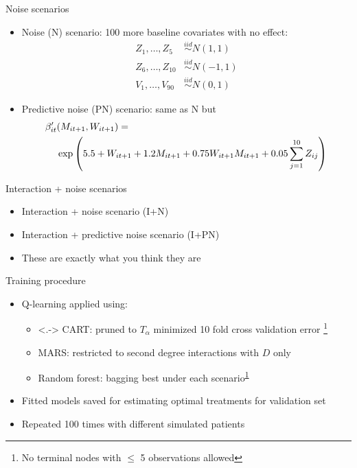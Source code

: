 \documentclass[handout]{beamer}
\begin{document}
\begin{frame}[c]{Noise scenarios}
  \begin{itemize}[<+->]
    \item Noise (N) scenario: 100 more baseline covariates with no effect:
  \begin{align*}
    Z_{1}, \ldots, Z_{5} &\overset{iid}{\sim} N(1, 1) \\
    Z_{6}, \ldots, Z_{10} &\overset{iid}{\sim} N(-1, 1) \\
    V_{1}, \ldots, V_{90} &\overset{iid}{\sim} N(0, 1)
  \end{align*}
  \item Predictive noise (PN) scenario: same as N but
  \begin{align*}
    \beta'_{it}&(M_{it+1}, W_{it+1}) = \\
    &\exp\del{5.5 + W_{it+1} + 1.2 M_{it+1} + 0.75 W_{it+1} M_{it+1} + 0.05 \sum_{j = 1}^{10} Z_{ij}}
  \end{align*}
  \end{itemize}
\end{frame}

\begin{frame}[c]{Interaction + noise scenarios}
  
  \begin{itemize}[<+->]
    \item Interaction + noise scenario (I+N)
    \item Interaction + predictive noise scenario (I+PN)
    \item These are exactly what you think they are
  \end{itemize}
\end{frame}


\begin{frame}[c]{Training procedure}
  \begin{itemize}[<+->]
    \item Q-learning applied using:
    \begin{itemize}
      \item<.-> CART: pruned to $T_{\alpha}$ minimized 10 fold cross validation error \footnote{\label{tree} No terminal nodes with $\leq$ 5 observations allowed}
      \item MARS: restricted to second degree interactions with $D$ only
      \item Random forest: bagging best under each scenario\textsuperscript{\ref{tree}}
    \end{itemize}
    \item Fitted models saved for estimating optimal treatments for validation set
    \item Repeated 100 times with different simulated patients
  \end{itemize}
\end{frame}
\end{document}
